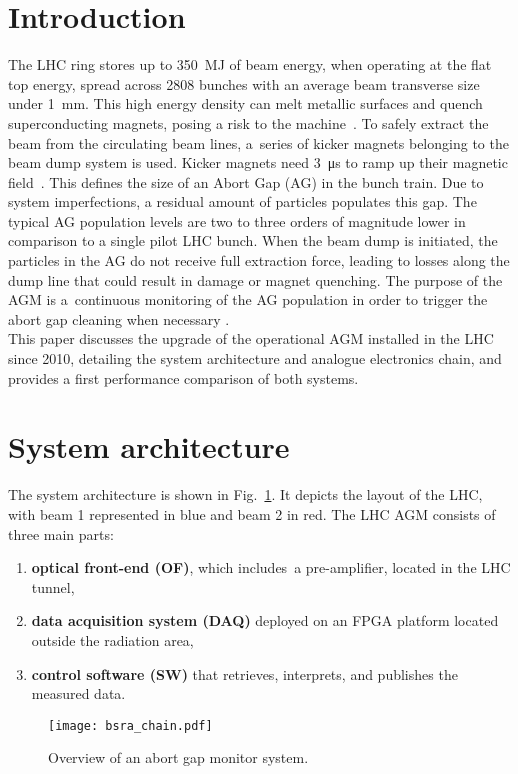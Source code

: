 \section{Introduction}
The LHC ring stores up to \SI{350}{MJ} of beam energy, when operating at the flat top energy, spread across 2808 bunches with an average beam transverse size under \SI{1}{mm}.
%
This high energy density can melt metallic surfaces and quench
superconducting magnets, posing a risk to the machine~\cite{LHC_report}.
%
To safely extract the beam from the circulating beam lines, a~series of kicker magnets belonging to the beam dump system is used. 
%
Kicker magnets need \SI{3}{\micro\second} to ramp up their magnetic field~\cite{beam_dump_system}.
%
This defines the size of an Abort Gap (AG) in the bunch train.
%
Due to system imperfections, a residual amount of particles populates this gap.
%
The typical AG population levels are two to three orders of magnitude lower in comparison to a single pilot LHC bunch.
%
When the beam dump is initiated, the particles in the AG do not receive full
extraction force, leading to losses along the dump line that could result in damage or magnet quenching.
%
%
The purpose of the AGM is a~continuous monitoring of the AG population in order to trigger the abort gap cleaning when  necessary \cite{particles_in_ag} .
\\
This paper discusses the upgrade of the operational AGM installed in the LHC since 2010, detailing the system architecture and analogue electronics chain, and provides a first performance comparison  of both systems.

\section{System architecture}
The system architecture is shown in Fig.~\ref{fig:bsra_chain}.
%
It depicts the layout of the LHC, with beam 1 represented in blue and beam 2 in red.
%
The LHC AGM consists of three main parts:
%
\begin{enumerate}
    \item \textbf{optical front-end (OF)}, which includes~a pre-amplifier, located in the LHC tunnel,
    \item \textbf{data acquisition system (DAQ)} deployed on an FPGA platform located outside the radiation area,
    \item \textbf{control software (SW)} that retrieves, interprets, and publishes the measured data.
\end{enumerate}
%
\begin{figure}[!tbh]
    \centering
    \texttt{[image: bsra\_chain.pdf]}
    \caption{Overview of an abort gap monitor system.}
    \label{fig:bsra_chain}
\end{figure} 

